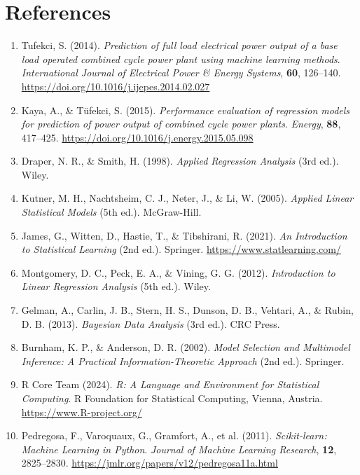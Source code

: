\documentclass[12pt,a4paper]{article}
\begin{document}
\section*{References}

\begin{enumerate}
    \item Tufekci, S. (2014). \textit{Prediction of full load electrical power output of a base load operated combined cycle power plant using machine learning methods}. \textit{International Journal of Electrical Power \& Energy Systems}, \textbf{60}, 126–140. \url{https://doi.org/10.1016/j.ijepes.2014.02.027}
    
    \item Kaya, A., \& Tüfekci, S. (2015). \textit{Performance evaluation of regression models for prediction of power output of combined cycle power plants}. \textit{Energy}, \textbf{88}, 417–425. \url{https://doi.org/10.1016/j.energy.2015.05.098}
    
    \item Draper, N. R., \& Smith, H. (1998). \textit{Applied Regression Analysis} (3rd ed.). Wiley.
    
    \item Kutner, M. H., Nachtsheim, C. J., Neter, J., \& Li, W. (2005). \textit{Applied Linear Statistical Models} (5th ed.). McGraw-Hill.
    
    \item James, G., Witten, D., Hastie, T., \& Tibshirani, R. (2021). \textit{An Introduction to Statistical Learning} (2nd ed.). Springer. \url{https://www.statlearning.com/}
    
    \item Montgomery, D. C., Peck, E. A., \& Vining, G. G. (2012). \textit{Introduction to Linear Regression Analysis} (5th ed.). Wiley.
    
    \item Gelman, A., Carlin, J. B., Stern, H. S., Dunson, D. B., Vehtari, A., \& Rubin, D. B. (2013). \textit{Bayesian Data Analysis} (3rd ed.). CRC Press.
    
    \item Burnham, K. P., \& Anderson, D. R. (2002). \textit{Model Selection and Multimodel Inference: A Practical Information-Theoretic Approach} (2nd ed.). Springer.
    
    \item R Core Team (2024). \textit{R: A Language and Environment for Statistical Computing}. R Foundation for Statistical Computing, Vienna, Austria. \url{https://www.R-project.org/}
    
    \item Pedregosa, F., Varoquaux, G., Gramfort, A., et al. (2011). \textit{Scikit-learn: Machine Learning in Python}. \textit{Journal of Machine Learning Research}, \textbf{12}, 2825–2830. \url{https://jmlr.org/papers/v12/pedregosa11a.html}
\end{enumerate}
\end{document}
